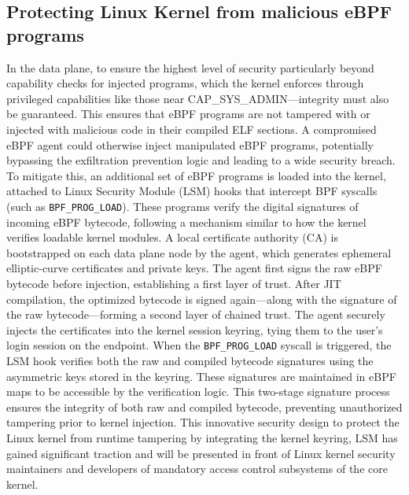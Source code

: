 \documentclass [11pt, proquest] {uwthesis}[2020/02/24]
\begin{document}
\subsection{Protecting Linux Kernel from malicious eBPF programs}
In the data plane, to ensure the highest level of security particularly beyond capability checks for injected programs, which the kernel enforces through privileged capabilities like those near CAP\_SYS\_ADMIN—integrity must also be guaranteed. This ensures that eBPF programs are not tampered with or injected with malicious code in their compiled ELF sections. A compromised eBPF agent could otherwise inject manipulated eBPF programs, potentially bypassing the exfiltration prevention logic and leading to a wide security breach. To mitigate this, an additional set of eBPF programs is loaded into the kernel, attached to Linux Security Module (LSM) hooks that intercept BPF syscalls (such as \texttt{BPF\_PROG\_LOAD}). These programs verify the digital signatures of incoming eBPF bytecode, following a mechanism similar to how the kernel verifies loadable kernel modules. A local certificate authority (CA) is bootstrapped on each data plane node by the agent, which generates ephemeral elliptic-curve certificates and private keys. The agent first signs the raw eBPF bytecode before injection, establishing a first layer of trust. After JIT compilation, the optimized bytecode is signed again—along with the signature of the raw bytecode—forming a second layer of chained trust. The agent securely injects the certificates into the kernel session keyring, tying them to the user’s login session on the endpoint. When the \texttt{BPF\_PROG\_LOAD} syscall is triggered, the LSM hook verifies both the raw and compiled bytecode signatures using the asymmetric keys stored in the keyring. These signatures are maintained in eBPF maps to be accessible by the verification logic. This two-stage signature process ensures the integrity of both raw and compiled bytecode, preventing unauthorized tampering prior to kernel injection. This innovative security design to protect the Linux kernel from runtime tampering by integrating the kernel keyring, LSM has gained significant traction and will be presented in front of Linux kernel security maintainers and developers of mandatory access control subsystems of the core kernel.
\end{document}
